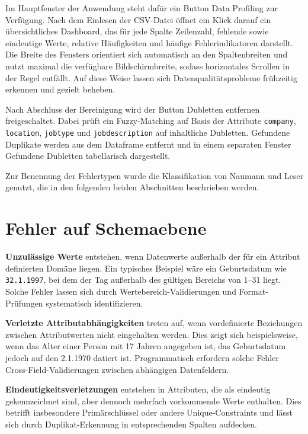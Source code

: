 \documentclass[
    a4paper,
    12pt,
    headinclude=true,
    BCOR=10mm,
]{scrreprt}
\begin{document}
Im Hauptfenster der Anwendung steht dafür ein Button \glqq Data Profiling\grqq{} zur Verfügung. Nach dem Einlesen der CSV-Datei öffnet ein Klick darauf ein übersichtliches Dashboard, das für jede Spalte Zeilenzahl, fehlende sowie eindeutige Werte, relative Häufigkeiten und häufige Fehlerindikatoren darstellt. Die Breite des Fensters orientiert sich automatisch an den Spaltenbreiten und nutzt maximal die verfügbare Bildschirmbreite, sodass horizontales Scrollen in der Regel entfällt. Auf diese Weise lassen sich Datenqualitätsprobleme frühzeitig erkennen und gezielt beheben.

Nach Abschluss der Bereinigung wird der Button \glqq Dubletten entfernen\grqq{} freigeschaltet. Dabei prüft ein Fuzzy-Matching auf Basis der Attribute \texttt{company}, \texttt{location}, \texttt{jobtype} und \texttt{jobdescription} auf inhaltliche Dubletten. Gefundene Duplikate werden aus dem Dataframe entfernt und in einem separaten Fenster \glqq Gefundene Dubletten\grqq{} tabellarisch dargestellt.

Zur Benennung der Fehlertypen wurde die Klassifikation von Naumann und Leser genutzt, die in den folgenden beiden Abschnitten beschrieben werden.

\section{Fehler auf Schemaebene}

\textbf{Unzulässige Werte} entstehen, wenn Datenwerte außerhalb der für ein Attribut definierten Domäne liegen. Ein typisches Beispiel wäre ein Geburtsdatum wie \texttt{32.1.1997}, bei dem der Tag außerhalb des gültigen Bereichs von 1--31 liegt. Solche Fehler lassen sich durch Wertebereich-Validierungen und Format-Prüfungen systematisch identifizieren.

\textbf{Verletzte Attributabhängigkeiten} treten auf, wenn vordefinierte Beziehungen zwischen Attributwerten nicht eingehalten werden. Dies zeigt sich beispielsweise, wenn das Alter einer Person mit 17 Jahren angegeben ist, das Geburtsdatum jedoch auf den 2.1.1970 datiert ist. Programmatisch erfordern solche Fehler Cross-Field-Validierungen zwischen abhängigen Datenfeldern.

\textbf{Eindeutigkeitsverletzungen} entstehen in Attributen, die als eindeutig gekennzeichnet sind, aber dennoch mehrfach vorkommende Werte enthalten. Dies betrifft insbesondere Primärschlüssel oder andere Unique-Constraints und lässt sich durch Duplikat-Erkennung in entsprechenden Spalten aufdecken.
\end{document}
